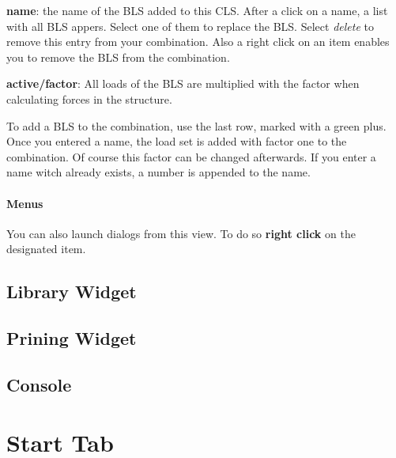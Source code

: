 \documentclass[a4paper,11pt]{report}
\begin{document}
\begin{trivlist}
\begin{trivlist}
\begin{trivlist}
			\item[]\textbf{name}: the name of the BLS added to this CLS. After a click on a name, a list with all BLS appers. Select one of them to replace the BLS. Select \textit{delete} to remove this entry from your combination. Also a right click on an item enables you to remove the BLS from the combination.
			\item[]\textbf{active/factor}: All loads of the BLS are multiplied with the factor when calculating forces in the structure.
		\end{trivlist}
		To add a BLS to the combination, use the last row, marked with a green plus. Once you entered a name, the load set is added with factor one to the combination. Of course this factor can be changed afterwards. If you enter a name witch already exists, a number is appended to the name.
	\end{trivlist}
\end{trivlist}

\paragraph{Menus}
You can also launch dialogs from this view. To do so \textbf{right click} on the designated item. 






\subsection{Library Widget}
\label{ssec:library}

\subsection{Prining Widget}
\label{ssec:printingwidget}

\subsection{Console}
\label{ssec:console}


\section{Start Tab}
\label{sec:starttab}
\end{document}
